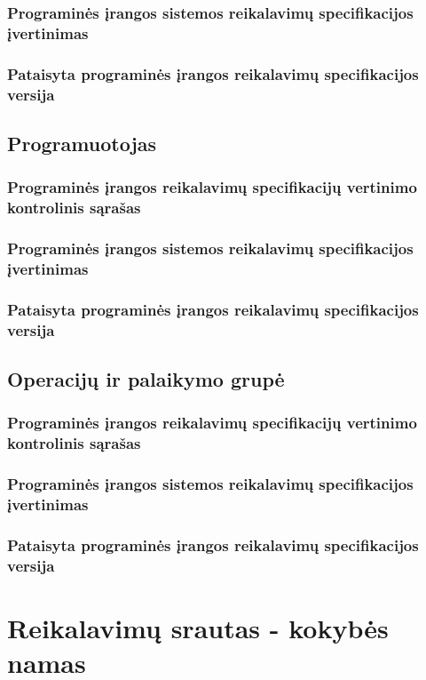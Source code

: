 \documentclass{VUMIFPSkursinis}
\begin{document}
			\subsubsection{Programinės įrangos sistemos reikalavimų specifikacijos įvertinimas}
			\subsubsection{Pataisyta programinės įrangos reikalavimų specifikacijos versija}
		\subsection{Programuotojas}
			\subsubsection{Programinės įrangos reikalavimų specifikacijų vertinimo kontrolinis sąrašas}
			\subsubsection{Programinės įrangos sistemos reikalavimų specifikacijos įvertinimas}
			\subsubsection{Pataisyta programinės įrangos reikalavimų specifikacijos versija}
		\subsection{Operacijų ir palaikymo grupė}
			\subsubsection{Programinės įrangos reikalavimų specifikacijų vertinimo kontrolinis sąrašas}
			\subsubsection{Programinės įrangos sistemos reikalavimų specifikacijos įvertinimas}
			\subsubsection{Pataisyta programinės įrangos reikalavimų specifikacijos versija}

	\section{Reikalavimų srautas - kokybės namas}
\end{document}
